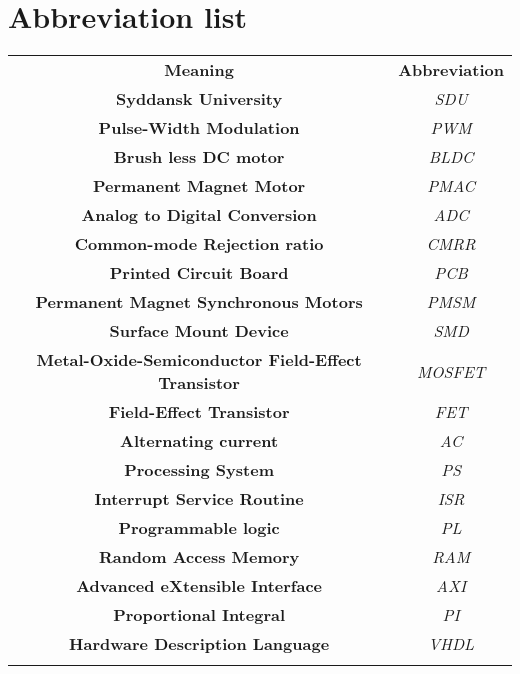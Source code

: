 \section{Abbreviation list}

\begin{center}
\begin{tabular}{|c|c|} \cline{1-2}
\textbf{Meaning} & \textbf{Abbreviation} \\ \cline{1-2}
\textbf{Syddansk University} & \textit{SDU} \\ \cline{1-2}
\textbf{Pulse-Width Modulation} & \textit{PWM} \\ \cline{1-2}
\textbf{Brush less DC motor} & \textit{BLDC} \\ \cline{1-2}
\textbf{Permanent Magnet Motor} & \textit{PMAC} \\ \cline{1-2}
\textbf{Analog to Digital Conversion} & \textit{ADC} \\ \cline{1-2}
\textbf{Common-mode Rejection ratio} & \textit{CMRR} \\ \cline{1-2}
\textbf{Printed Circuit Board} & \textit{PCB} \\ \cline{1-2}
\textbf{Permanent Magnet Synchronous Motors} & \textit{PMSM} \\ \cline{1-2}
\textbf{Surface Mount Device} & \textit{SMD} \\ \cline{1-2}
\textbf{Metal-Oxide-Semiconductor Field-Effect Transistor} & \textit{MOSFET} \\ \cline{1-2}
\textbf{Field-Effect Transistor} & \textit{FET} \\ \cline{1-2}
\textbf{Alternating current} & \textit{AC} \\ \cline{1-2}
\textbf{Processing System} & \textit{PS} \\ \cline{1-2}
\textbf{Interrupt Service Routine} & \textit{ISR} \\ \cline{1-2}
\textbf{Programmable logic} & \textit{PL} \\ \cline{1-2}
\textbf{Random Access Memory} & \textit{RAM} \\ \cline{1-2}
\textbf{Advanced eXtensible Interface} & \textit{AXI} \\ \cline{1-2}
\textbf{Proportional Integral} & \textit{PI} \\ \cline{1-2}
\textbf{Hardware Description Language} & \textit{VHDL} \\ \cline{1-2}
\textbf{} & \textit{} \\ \cline{1-2}
\end{tabular}
\end{center}